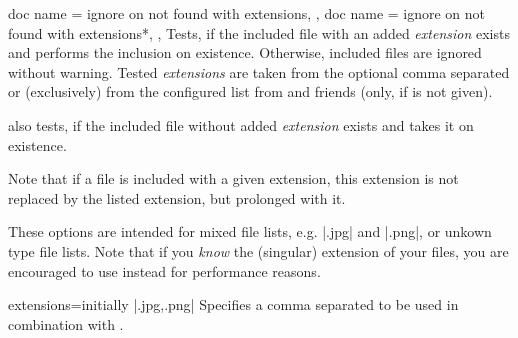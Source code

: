 \documentclass[a4paper,11pt]{ltxdoc}
\begin{document}
\begin{docIgrKeys}[
    doc parameter eq marg* = extension list,
    doc description        = initially unset,
    doc new  = 2021-10-16,
  ]
  {
    {
      doc name = ignore on not found with extensions,
    },
    {
      doc name = ignore on not found with extensions*,
    },
  }
  Tests, if the included file with an added \emph{extension} exists and
  performs the inclusion on existence. Otherwise, included files are ignored without warning.
  Tested \emph{extensions} are taken from the optional comma separated 
  or (exclusively) from the configured list from  and friends
  (only, if  is not given).\par
   also tests, if the included
  file without added \emph{extension} exists and takes it on existence.\par
  Note that if a file is included with a given extension, this extension is not
  replaced by the listed extension, but prolonged with it.\par
  These options are intended for mixed file lists, e.g. |.jpg| and |.png|, or
  unkown type file lists.
  Note that if you \emph{know} the (singular) extension of your files, you are
  encouraged to use  instead for performance reasons.
\begin{dispListing}
\end{dispListing}
\end{docIgrKeys}


\begin{docIgrKey}[][doc new=2021-10-16]{extensions}{=}{initially |.jpg,.png|}
  Specifies a comma separated  to be used in combination with
  .
\end{docIgrKey}
\end{document}
